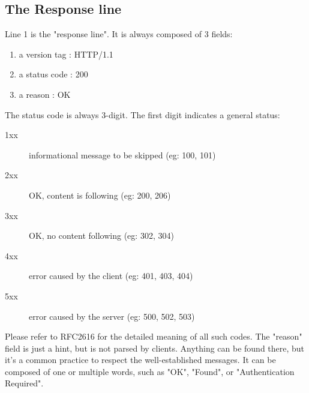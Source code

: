 \subsection{The Response line}
\begin{samepage}
Line 1 is the "response line". It is always composed of 3 fields:
\begin{enumerate}
\item a version tag : HTTP/1.1
\item a status code : 200
\item a reason      : OK
\end{enumerate}
\end{samepage}

\begin{samepage}
The status code is always 3-digit. The first digit indicates a general status:
\begin{description}
\item[1xx] informational message to be skipped (eg: 100, 101)
\item[2xx] OK, content is following   (eg: 200, 206)
\item[3xx] OK, no content following   (eg: 302, 304)
\item[4xx] error caused by the client (eg: 401, 403, 404)
\item[5xx] error caused by the server (eg: 500, 502, 503)
\end{description}
\end{samepage}

Please refer to RFC2616 for the detailed meaning of all such codes. The
"reason" field is just a hint, but is not parsed by clients. Anything can be
found there, but it's a common practice to respect the well-established
messages. It can be composed of one or multiple words, such as "OK", "Found",
or "Authentication Required".

